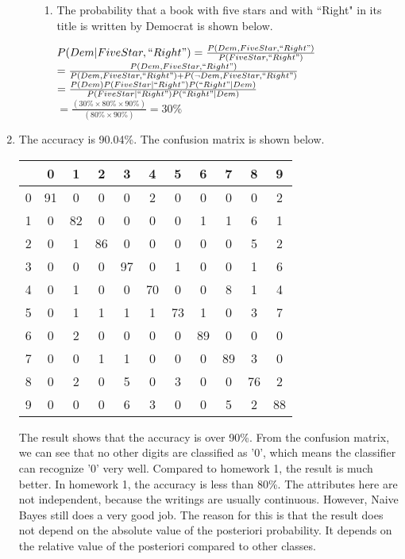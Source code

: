 \documentclass[11pt,letterpaper,oneside]{article}
\begin{document}
\begin{enumerate}
\begin{enumerate}
\begin{enumerate}
    \item The probability that a book with five stars and with ``Right" in its title is written by Democrat is shown below.

$P(Dem | FiveStar, ``Right") = \frac{P(Dem, FiveStar, ``Right")}{P(FiveStar, ``Right")}$\\$= \frac{P(Dem, FiveStar, ``Right")}{P(Dem, FiveStar, ``Right") + P(\neg Dem, FiveStar, ``Right")}$\\$=  \frac{P(Dem)P(FiveStar | ``Right")P(``Right" | Dem)}{P(FiveStar | ``Right")P(``Right" | Dem)}$\\$= \frac{(30\% \times 80\% \times 90\%)}{(80\% \times 90\%)} = 30\%$
    \end{enumerate}

  \end{enumerate}

\item The accuracy is 90.04\%. The confusion matrix is shown below.

  \begin{tabular}{c|cccccccccc}
     & 0 & 1 & 2 & 3 & 4 & 5 & 6 & 7 & 8 & 9\\ \hline
   0 & 91&  0&  0&  0&  2&  0&  0&  0&  0&  2\\
   1 & 0& 82&  0&  0&  0&  0&  1&  1&  6&  1\\
   2 & 0&  1& 86&  0&  0&  0&  0&  0&  5&  2\\
   3 & 0&  0&  0& 97&  0&  1&  0&  0&  1&  6\\
   4 & 0&  1&  0&  0& 70&  0&  0&  8&  1&  4\\
   5 & 0&  1&  1&  1&  1& 73&  1&  0&  3&  7\\
   6 & 0&  2&  0&  0&  0&  0& 89&  0&  0&  0\\
   7 & 0&  0&  1&  1&  0&  0&  0& 89&  3&  0\\
   8 & 0&  2&  0&  5&  0&  3&  0&  0& 76&  2\\
   9 & 0&  0&  0&  6&  3&  0&  0&  5&  2& 88\\
  \end{tabular}

The result shows that the accuracy is over 90\%. From the confusion matrix, we can see that no other digits are classified as '0', which means the classifier can recognize '0' very well. Compared to homework 1, the result is much better. In homework 1, the accuracy is less than 80\%. The attributes here are not independent, because the writings are usually continuous. However, Naive Bayes still does a very good job. The reason for this is that the result does not depend on the absolute value of the posteriori probability. It depends on the relative value of the posteriori compared to other classes.


\end{enumerate}
\end{document}
